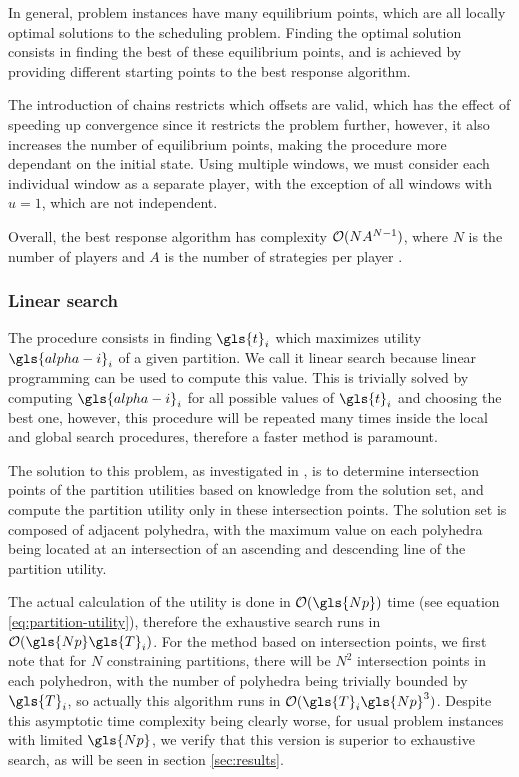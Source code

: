 \documentclass[main.tex]{subfiles}
\begin{document}
In general, problem instances have many equilibrium points, which are all locally optimal solutions to the scheduling problem.
Finding the optimal solution consists in finding the best of these equilibrium points, and is achieved by providing different starting points to the best response algorithm.

The introduction of chains restricts which offsets are valid, which has the effect of speeding up convergence since it restricts the problem further, however, it also increases the number of equilibrium points, making the procedure more dependant on the initial state.
Using multiple windows, we must consider each individual window as a separate player, with the exception of all windows with $u=1$, which are not independent.

Overall, the best response algorithm has complexity $\mathcal{O}(NA^{N-1})$, where $N$ is the number of players and $A$ is the number of strategies per player \cite{durand2016complexity}.

\subsubsection{Linear search}
\label{sec:line}

The  procedure consists in finding $\gls{t}_i$ which maximizes utility $\gls{alpha-i}_i$ of a given partition.
We call it linear search because linear programming can be used to compute this value.
This is trivially solved by computing $\gls{alpha-i}_i$ for all possible values of $\gls{t}_i$ and choosing the best one, however, this procedure will be repeated many times inside the local and global search procedures, therefore a faster method is paramount.

The solution to this problem, as investigated in \textcite{al2012strictly, pira2016line}, is to determine intersection points of the partition utilities based on knowledge from the solution set, and compute the partition utility only in these intersection points.
The solution set is composed of adjacent polyhedra, with the maximum value on each polyhedra being located at an intersection of an ascending and descending line of the partition utility.

The actual calculation of the utility is done in $\bigO(\gls{Np})$ time (see equation \ref{eq:partition-utility}), therefore the exhaustive search runs in $\bigO(\gls{Np}\gls{T}_i)$.
For the method based on intersection points, we first note that for $N$ constraining partitions, there will be $N^2$ intersection points in each polyhedron, with the number of polyhedra being trivially bounded by $\gls{T}_i$, so actually this algorithm runs in $\bigO(\gls{T}_i\gls{Np}^3)$.
Despite this asymptotic time complexity being clearly worse, for usual problem instances with limited $\gls{Np}$, we verify that this version is superior to exhaustive search, as will be seen in section \ref{sec:results}.
\end{document}
